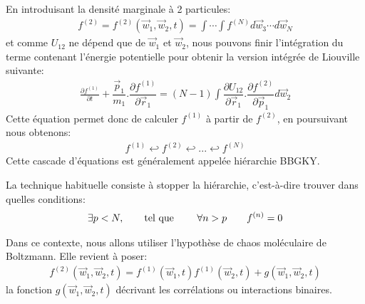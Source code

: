 En introduisant la densité marginale à 2 particules:
\begin{align*}
	f^{(2)}=f^{(2)}(\vec{w}_{1},\vec{w}_{2},t)=\int\cdots\int f^{(N)}d\vec{w}_{3}\cdots d\vec{w}_{N}
\end{align*}
et comme $U_{12}$ ne dépend que de $\vec{w}_{1}$ et $\vec{w}_{2}$, nous pouvons finir l'intégration du terme contenant l'énergie potentielle pour
obtenir la version intégrée de Liouville suivante:
\begin{align}
	\frac{\partial f^{(1)}}{\partial t}+\dfrac{\vec{p}_{1}}{m_{1}}.\dfrac{\partial f^{(1)}}{\partial\vec{r}_{1}}=\left(  N-1\right)
	\displaystyle \int\dfrac{\partial U_{12}}{\partial\vec{r}_{1}}.\dfrac{\partial f^{(2)}}{\partial\vec{p}_{1}}d\vec{w}_{2}%
	\label{liouint}%
\end{align}
Cette équation permet donc de calculer $f^{(1)}$ à partir de $f^{(2)}$, en poursuivant nous obtenons:
\begin{align*}
	f^{(1)}\hookleftarrow f^{(2)}\hookleftarrow...\hookleftarrow f^{(N)}
\end{align*}
Cette cascade d'équations est généralement appelée
hiérarchie BBGKY.

La technique habituelle consiste à stopper la hiérarchie, c'est-à-dire trouver dans quelles conditions:
\begin{align*}
	\exists p<N,\qquad\text{tel que \qquad}\forall n>p\qquad f^{\left(  n\right) }=0
\end{align*}


Dans ce contexte, nous allons utiliser l'hypothèse de chaos moléculaire de Boltzmann. Elle revient à poser:
\begin{align*}
	f^{(2)}(\vec{w}_{1},\vec{w}_{2},t)=f^{(1)}(\vec{w}_{1},t)f^{(1)}(\vec{w}_{2},t)+g(\vec{w}_{1},\vec{w}_{2},t)
\end{align*}
la fonction $g(\vec{w}_{1},\vec{w}_{2},t)$ décrivant les corrélations ou interactions binaires.

